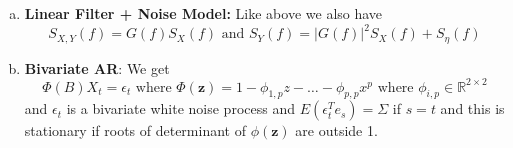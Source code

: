\documentclass{article}
\begin{document}
\begin{enumerate} [a.]
    \item \textbf{Linear Filter + Noise Model:} Like above we also have
    \[
    S_{X,Y}(f) = G(f) S_X(f) \text{ and } S_Y(f) = |G(f)|^2S_X(f) + S_\eta(f)
    \]

    \item \textbf{Bivariate AR}: We get
    \[
    \Phi(B)X_t = \epsilon_t \text{ where } \Phi(\textbf{z}) = 1 - \phi_{1,p }z - \dots - \phi_{p,p}x^p \text{ where } \phi_{i,p} \in \mathbb{R}^{2 \times 2}
    \]
    and \(\epsilon_t\) is a bivariate white noise process and \(E(\epsilon_t^Te_s) = \Sigma\) if \(s = t\) and this is stationary if roots of determinant of \(\phi(\textbf{z})\) are outside 1.

\end{enumerate}
     
\end{document}
